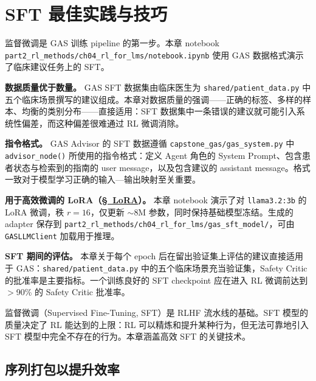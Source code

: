 \chapter{SFT 最佳实践与技巧}
\label{sec:sft-best-practices}

\begin{keybox}
监督微调是 GAS 训练 pipeline 的第一步。本章 notebook \texttt{part2\_rl\_methods/ch04\_rl\_for\_lms/notebook.ipynb} 使用 GAS 数据格式演示了临床建议任务上的 SFT。

\textbf{数据质量优于数量。}
GAS SFT 数据集由临床医生为 \texttt{shared/patient\_data.py} 中五个临床场景撰写的建议组成。本章对数据质量的强调——正确的标签、多样的样本、均衡的类别分布——直接适用：SFT 数据集中一条错误的建议就可能引入系统性偏差，而这种偏差很难通过 RL 微调消除。

\textbf{指令格式。}
GAS Advisor 的 SFT 数据遵循 \texttt{capstone\_gas/gas\_system.py} 中 \texttt{advisor\_node()} 所使用的指令格式：定义 Agent 角色的 System Prompt、包含患者状态与检索到的指南的 user message，以及包含建议的 assistant message。格式一致对于模型学习正确的输入—输出映射至关重要。

\textbf{用于高效微调的 LoRA（\hyperref[lora-and-parameter-efficient-fine-tuning]{\S~LoRA}）。}
本章 notebook 演示了对 \texttt{llama3.2:3b} 的 LoRA 微调，秩 $r=16$，仅更新 $\sim$8M 参数，同时保持基础模型冻结。生成的 adapter 保存到 \texttt{part2\_rl\_methods/ch04\_rl\_for\_lms/gas\_sft\_model/}，可由 \texttt{GASLLMClient} 加载用于推理。

\textbf{SFT 期间的评估。}
本章关于每个 epoch 后在留出验证集上评估的建议直接适用于 GAS：\texttt{shared/patient\_data.py} 中的五个临床场景充当验证集，Safety Critic 的批准率是主要指标。一个训练良好的 SFT checkpoint 应在进入 RL 微调前达到 $>$90\% 的 Safety Critic 批准率。
\end{keybox}

监督微调（Supervised Fine-Tuning, SFT）是 RLHF 流水线的基础。SFT 模型的质量决定了 RL 能达到的上限：RL 可以精炼和提升某种行为，但无法可靠地引入 SFT 模型中完全不存在的行为。本章涵盖高效 SFT 的关键技术。

\section{序列打包以提升效率}
\label{sec:sequence-packing}


